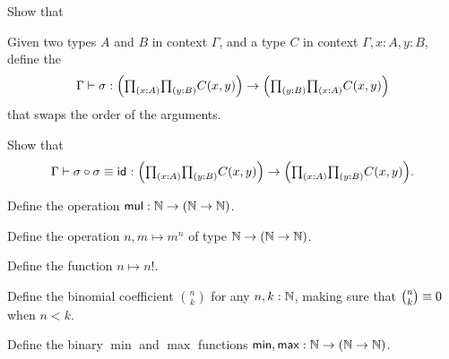 \begin{exercises}
\begin{subexenum}
\begin{prooftree}
\end{prooftree}
\item Show that
\begin{prooftree}
\end{prooftree}
\end{subexenum}
\item \label{ex:swap}
\begin{subexenum}
\item Given two types $A$ and $B$ in context $\Gamma$, and a type $C$ in context $\Gamma,x:A,y:B$, define the 
\begin{equation*}
\Gamma\vdash \sigma:\Big(\prd{x:A}{y:B}C(x,y)\Big)\to\Big(\prd{y:B}{x:A}C(x,y)\Big)
\end{equation*}
that swaps the order of the arguments.
\item Show that
\begin{equation*}
\Gamma\vdash \sigma\circ\sigma\jdeq\idfunc:\Big(\prd{x:A}{y:B}C(x,y)\Big)\to \Big(\prd{x:A}{y:B}C(x,y)\Big).
\end{equation*}
\end{subexenum}
\item 
\begin{subexenum}
\item Define the  operation $\mathsf{mul}:\N\to(\N\to\N)$.
\item Define the  operation $n,m\mapsto m^n$ of type $\N\to (\N\to \N)$.
\item Define the  function $n\mapsto n!$.
\item Define the binomial coefficient $\binom{n}{k}$ for any $n,k:\N$, making sure that $\binom{n}{k}\jdeq 0$ when $n<k$.
\end{subexenum}
\item Define the binary $\min$ and $\max$ functions $\mathsf{min},\mathsf{max}:\N\to(\N\to\N)$.

\end{exercises}
